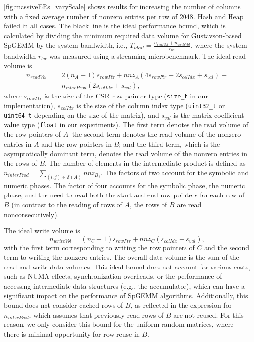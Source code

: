 \autoref{fig:massiveERs_varyScale} shows results for increasing the number of columns with a fixed average number of nonzero entries per row of 2048.
Hash and Heap failed in all cases.
The black line is the ideal performance bound, which is calculated by dividing the minimum required data volume for Gustavson-based SpGEMM by the system bandwidth, i.e., $T_{ideal} = \frac{n_{readVol}+n_{writeVol}}{r_{bw}}$,
where the system bandwidth $r_{bw}$ was measured using a streaming microbenchmark.
The ideal read volume is
\begin{equation}
\begin{aligned}
n_{readVol} = & 2(n_A+1) s_{rowPtr} + nnz_A(4s_{rowPtr} + 2s_{colIdx} + s_{val}) + \\
& n_{interProd} (2s_{colIdx} + s_{val}),
\end{aligned}
\label{equ:ideal_data_vol}
\end{equation}
where $s_{rowPtr}$ is the size of the CSR row pointer type (\texttt{size\_t} in our implementation), $s_{colIdx}$ is the size of the column index type (\texttt{uint32\_t} or \texttt{uint64\_t} depending on the size of the matrix), and $s_{val}$ is the matrix coefficient value type (\texttt{float} in our experiments).
The first term denotes the read volume of the row pointers of $A$; the second term denotes the read volume of the nonzero entries in $A$ and the row pointers in $B$; and the third term, which is the asymptotically dominant term, denotes the read volume of the nonzero entries in the rows of $B$.
The number of elements in the intermediate product is defined as $n_{interProd} = \sum_{(i,j)\in \mathcal{S}(A)}nnz_{B_j}$.
The factors of two account for the symbolic and numeric phases.
The factor of four accounts for the symbolic phase, the numeric phase, and the need to read both the start and end row pointers for each row of $B$ (in contrast to the reading of rows of $A$, the rows of $B$ are read nonconsecutively).

The ideal write volume is 
\begin{equation}
n_{writeVol} = (n_C+1) s_{rowPtr} + nnz_C (s_{colIdx} + s_{val}),
\end{equation}
with the first term corresponding to writing the row pointers of $C$ and the second term to writing the nonzero entries.
The overall data volume is the sum of the read and write data volumes.
This ideal bound does not account for various costs, such as NUMA effects, synchronization overheads, or the performance of accessing intermediate data structures (e.g., the accumulator), which can have a significant impact on the performance of SpGEMM algorithms.
Additionally, this bound does not consider cached rows of $B$, as reflected in the expression for $n_{interProd}$, which assumes that previously read rows of $B$ are not reused.
For this reason, we only consider this bound for the uniform random matrices, where there is minimal opportunity for row reuse in $B$.


